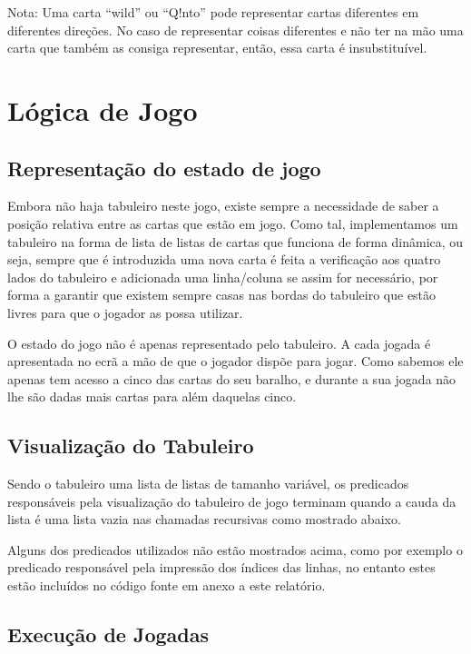 \documentclass[a4paper]{article}
\begin{document}
	\small
	\noindent
	Nota: Uma carta “wild” ou “Q!nto” pode representar cartas diferentes em diferentes direções. No caso de representar coisas diferentes e não ter na mão uma carta que também as consiga representar, então, essa carta é insubstituível.
	\normalsize
	\newpage

	\section{Lógica de Jogo}
	\subsection{Representação do estado de jogo}

	Embora não haja tabuleiro neste jogo, existe sempre a necessidade de saber a posição relativa entre as cartas que estão em jogo. Como tal, implementamos um tabuleiro na forma de lista de listas de cartas que funciona de forma dinâmica, ou seja, sempre que é introduzida uma nova carta é feita a verificação aos quatro lados do tabuleiro e adicionada uma linha/coluna se assim for necessário, por forma a garantir que existem sempre casas nas bordas do tabuleiro que estão livres para que o jogador as possa utilizar.
	
O estado do jogo não é apenas representado pelo tabuleiro. A cada jogada é apresentada no ecrã a mão de que o jogador dispõe para jogar. Como sabemos ele apenas tem acesso a cinco das cartas do seu baralho, e durante a sua jogada não lhe são dadas mais cartas para além daquelas cinco.
	
	\subsection{Visualização do Tabuleiro}

	Sendo o tabuleiro uma lista de listas de tamanho variável, os predicados responsáveis pela visualização do tabuleiro de jogo terminam quando a cauda da lista é uma lista vazia nas chamadas recursivas como mostrado abaixo.

	Alguns dos predicados utilizados não estão mostrados acima, como por exemplo o predicado responsável pela impressão dos índices das linhas, no entanto estes estão incluídos no código fonte em anexo a este relatório.

	\subsection{Execução de Jogadas}
\end{document}
